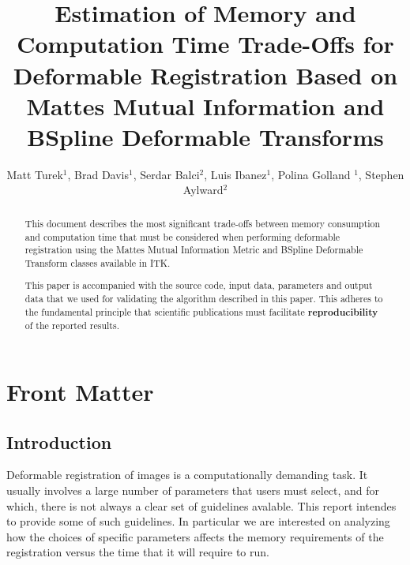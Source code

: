 \documentclass{InsightArticle}
\title{Estimation of Memory and Computation Time Trade-Offs for Deformable
Registration Based on Mattes Mutual Information and BSpline Deformable
Transforms}
\author{Matt Turek$^{1}$, Brad Davis$^{1}$, Serdar Balci$^{2}$, Luis
Ibanez$^{1}$, Polina Golland $^{1}$, Stephen Aylward$^{2}$}
\begin{document}
\ifpdf
\else
\fi


\maketitle


\ifhtml
\chapter*{Front Matter\label{front}}
\fi


\begin{abstract}
\noindent
This document describes the most significant trade-offs between memory
consumption and computation time that must be considered when performing
deformable registration using the Mattes Mutual Information Metric and BSpline
Deformable Transform classes available in ITK.

This paper is accompanied with the source code, input data, parameters and
output data that we used for validating the algorithm described in this paper.
This adheres to the fundamental principle that scientific publications must
facilitate \textbf{reproducibility} of the reported results.
\end{abstract}

\tableofcontents

\section{Introduction}

Deformable registration of images is a computationally demanding task. It
usually involves a large number of parameters that users must select, and for
which, there is not always a clear set of guidelines avalable. This report
intendes to provide some of such guidelines. In particular we are interested on
analyzing how the choices of specific parameters affects the memory
requirements of the registration versus the time that it will require to run.
\end{document}
